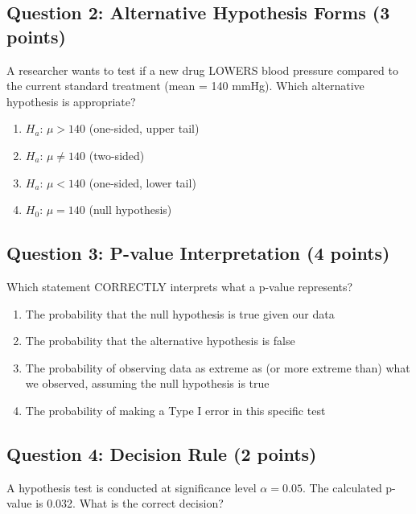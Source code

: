 \documentclass[11pt]{article}
\begin{document}
\vspace{0.5cm}

\subsection*{Question 2: Alternative Hypothesis Forms (3 points)}

A researcher wants to test if a new drug LOWERS blood pressure compared to the current standard treatment (mean = 140 mmHg). Which alternative hypothesis is appropriate?

\begin{enumerate}[label=\Alph*)]
\item $H_a$: $\mu > 140$ (one-sided, upper tail)
\item $H_a$: $\mu \neq 140$ (two-sided)
\item $H_a$: $\mu < 140$ (one-sided, lower tail)
\item $H_0$: $\mu = 140$ (null hypothesis)
\end{enumerate}

\vspace{0.5cm}

\subsection*{Question 3: P-value Interpretation (4 points)}

Which statement CORRECTLY interprets what a p-value represents?

\begin{enumerate}[label=\Alph*)]
\item The probability that the null hypothesis is true given our data
\item The probability that the alternative hypothesis is false
\item The probability of observing data as extreme as (or more extreme than) what we observed, assuming the null hypothesis is true
\item The probability of making a Type I error in this specific test
\end{enumerate}

\vspace{0.5cm}

\subsection*{Question 4: Decision Rule (2 points)}

A hypothesis test is conducted at significance level $\alpha = 0.05$. The calculated p-value is 0.032. What is the correct decision?
\end{document}
